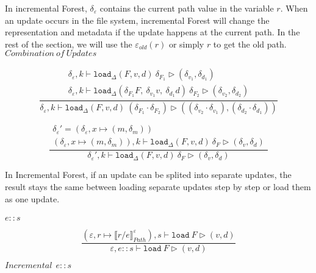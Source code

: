 \documentclass[10pt,twoside,a4paper]{article}
\theoremstyle{theorem}
\theoremstyle{lemma}
\theoremstyle{property}
\theoremstyle{definition}
\theoremstyle{assumption}
\begin{document}
In incremental Forest, $\delta_\varepsilon$ contains the current path value in the variable $r$. When an update occurs in the file system, incremental Forest will change the representation and metadata if the update happens at the current path. 
In the rest of the section, we will use the $\varepsilon_{old}(r)$ or simply $r$ to get the old path.\\

$\boxed{Combination ~ of ~ Updates}$

\begin{displaymath}
	\frac{\begin{array}{c}
		\delta_\varepsilon, k \vdash \mathtt{load}_\Delta (F,v,d)~ \delta_{F_1} \rhd (\delta_{v_1}, \delta_{d_1})\\
		\delta_\varepsilon, k \vdash \mathtt{load}_\Delta (\delta_{F_1} F,~\delta_{v_1} v,~\delta_{d_1} d)~ \delta_{F_2} \rhd (\delta_{v_2}, \delta_{d_2})
	\end{array}}
	{\delta_\varepsilon, k \vdash \mathtt{load}_\Delta (F,v,d)~ (\delta_{F_1} \cdot \delta_{F_2}) \rhd ((\delta_{v_2} \cdot \delta_{v_1}), (\delta_{d_2} \cdot \delta_{d_1}))}
\end{displaymath}

\begin{displaymath}
	\frac{\begin{array}{c}
		{\delta_\varepsilon}' = (\delta_\varepsilon, x \mapsto (m, \delta_m))\\
		(\delta_\varepsilon, x \mapsto (m, \delta_m)), k \vdash \mathtt{load}_\Delta (F,v,d)~ \delta_F \rhd (\delta_v, \delta_d)
	\end{array}}
	{{\delta_\varepsilon}', k \vdash \mathtt{load}_\Delta (F,v,d)~ \delta_F \rhd (\delta_v, \delta_d)}
\end{displaymath}

In Incremental Forest, if an update can be splited into separate updates, the result stays the same between loading separate updates step by step or load them as one update.\\
\\

$\boxed{e::s}$

\begin{displaymath}
	\frac{
		(\varepsilon, r \mapsto \llbracket r/e \rrbracket^\varepsilon_{Path}) , s \vdash \mathtt{load}~F \rhd (v, d)
	}
	{
		\varepsilon, e::s \vdash \mathtt{load}~F \rhd (v,d)
	}
\end{displaymath}

$\boxed{Incremental~~e::s}$
\end{document}

